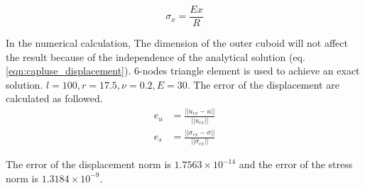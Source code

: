 \begin{equation}
  \sigma_x = \frac{Ex}{R}
  \label{eqn:caplus_stress}
\end{equation}

In the numerical calculation, The dimension of the outer cuboid will not affect the result because of the independence of the analytical solution (eq.\ref{eqn:capluse_displacement}). 6-nodes triangle element is used to achieve an exact solution. $l=100,r=17.5,\nu=0.2,E=30$. The error of the displacement are calculated as followed.
\begin{subequations}
\begin{align}
e_u &= \frac{||u_{ex} - u||}{||u_{ex}||}\\
e_s &= \frac{||\sigma_{ex} - \sigma||}{||\sigma_{ex}||}
\end{align}
\end{subequations}

The error of the displacement norm is $1.7563\times 10^{-14}$ and the error of the stress norm is $1.3184\times 10^{-9}$.
\pagebreak